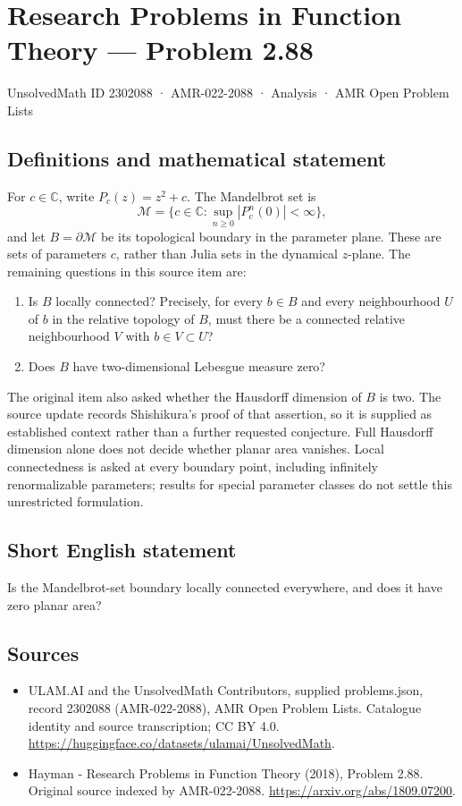 \documentclass[11pt,a4paper]{article}
\begin{document}
\section*{Research Problems in Function Theory — Problem 2.88}\label{2302088}
{\small UnsolvedMath ID 2302088 · AMR-022-2088 · Analysis · AMR Open Problem Lists}
\subsection{Definitions and mathematical statement}
For $c\in\mathbb C$, write $P_c(z)=z^2+c$. The Mandelbrot set is
\[
\mathcal M=\{c\in\mathbb C:\sup_{n\ge0}|P_c^n(0)|<\infty\},
\]
and let $B=\partial\mathcal M$ be its topological boundary in the parameter plane. These are sets of parameters $c$, rather than Julia sets in the dynamical $z$-plane.
The remaining questions in this source item are:
\begin{enumerate}
\item Is $B$ locally connected? Precisely, for every $b\in B$ and every neighbourhood $U$ of $b$ in the relative topology of $B$, must there be a connected relative neighbourhood $V$ with $b\in V\subset U$?
\item Does $B$ have two-dimensional Lebesgue measure zero?
\end{enumerate}
The original item also asked whether the Hausdorff dimension of $B$ is two. The source update records Shishikura's proof of that assertion, so it is supplied as established context rather than a further requested conjecture. Full Hausdorff dimension alone does not decide whether planar area vanishes. Local connectedness is asked at every boundary point, including infinitely renormalizable parameters; results for special parameter classes do not settle this unrestricted formulation.
\subsection{Short English statement}
Is the Mandelbrot-set boundary locally connected everywhere, and does it have zero planar area?
\subsection{Sources}
\begin{itemize}
\item[S1] ULAM.AI and the UnsolvedMath Contributors, supplied problems.json, record 2302088 (AMR-022-2088), AMR Open Problem Lists. Catalogue identity and source transcription; CC BY 4.0.
\url{https://huggingface.co/datasets/ulamai/UnsolvedMath}.
\item[S2] Hayman - Research Problems in Function Theory (2018), Problem 2.88. Original source indexed by AMR-022-2088.
\url{https://arxiv.org/abs/1809.07200}.
\end{itemize}
\end{document}
